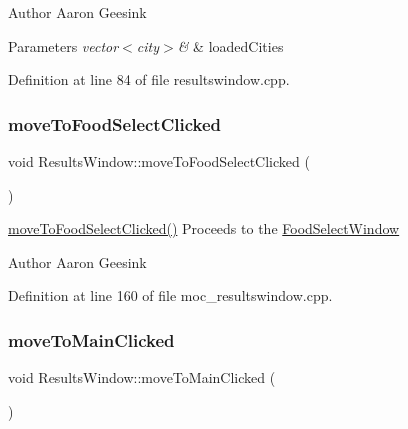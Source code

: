 \begin{DoxyAuthor}{Author}
Aaron Geesink 
\end{DoxyAuthor}

\begin{DoxyParams}{Parameters}
{\em vector$<$city$>$\&} & loaded\+Cities \\
\hline
\end{DoxyParams}


Definition at line 84 of file resultswindow.\+cpp.

\mbox{\label{class_results_window_a7a545927d8dd85526646a5d05d758052}} 
\subsubsection{\texorpdfstring{moveToFoodSelectClicked}{moveToFoodSelectClicked}}
{\footnotesize\ttfamily void Results\+Window\+::move\+To\+Food\+Select\+Clicked (\begin{DoxyParamCaption}{ }\end{DoxyParamCaption})\hspace{0.3cm}{\ttfamily [signal]}}



\mbox{\hyperlink{class_results_window_a7a545927d8dd85526646a5d05d758052}{move\+To\+Food\+Select\+Clicked()}} Proceeds to the \mbox{\hyperlink{class_food_select_window}{Food\+Select\+Window}} 

\begin{DoxyAuthor}{Author}
Aaron Geesink 
\end{DoxyAuthor}


Definition at line 160 of file moc\+\_\+resultswindow.\+cpp.

\mbox{\label{class_results_window_a55bcbc29f4f178f52fc610a09ec21cb3}} 
\subsubsection{\texorpdfstring{moveToMainClicked}{moveToMainClicked}}
{\footnotesize\ttfamily void Results\+Window\+::move\+To\+Main\+Clicked (\begin{DoxyParamCaption}{ }\end{DoxyParamCaption})\hspace{0.3cm}{\ttfamily [signal]}}



